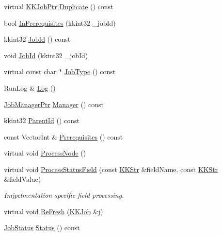 \begin{DoxyCompactItemize}
virtual \hyperlink{class_k_k_job_managment_1_1_k_k_job_a53526e4ffe4ab2b7858f79ab0ed65a1d}{K\+K\+Job\+Ptr} \hyperlink{class_k_k_job_managment_1_1_k_k_job_a8565b4f24dbcf979f959850e186cc91d}{Duplicate} () const 
\item 
bool \hyperlink{class_k_k_job_managment_1_1_k_k_job_a8da48b535df519acf19278af28bf5dee}{In\+Prerequisites} (kkint32 \+\_\+job\+Id)
\item 
kkint32 \hyperlink{class_k_k_job_managment_1_1_k_k_job_a37a4f0f8bfafda64563f30034348e5f5}{Job\+Id} () const 
\item 
void \hyperlink{class_k_k_job_managment_1_1_k_k_job_a0002b79993d2f4cb2e185c0cfcc22bf6}{Job\+Id} (kkint32 \+\_\+job\+Id)
\item 
virtual const char $\ast$ \hyperlink{class_k_k_job_managment_1_1_k_k_job_a77bf2a420c86aa73133a198416b97f81}{Job\+Type} () const 
\item 
Run\+Log \& \hyperlink{class_k_k_job_managment_1_1_k_k_job_a536ae6e96926995a86c5f3c65f26bd71}{Log} ()
\item 
\hyperlink{namespace_k_k_job_managment_aa12a7270f9983ca4ed916533dc8adbc4}{Job\+Manager\+Ptr} \hyperlink{class_k_k_job_managment_1_1_k_k_job_adbe88cadac87d49ce058fad86b2a2ab2}{Manager} () const 
\item 
kkint32 \hyperlink{class_k_k_job_managment_1_1_k_k_job_aa7501a072e3a0535099ab982a67867ae}{Parent\+Id} () const 
\item 
const Vector\+Int \& \hyperlink{class_k_k_job_managment_1_1_k_k_job_ae2ff42969518284ece1f2e4e78805489}{Prerequisites} () const 
\item 
virtual void \hyperlink{class_k_k_job_managment_1_1_k_k_job_a609d9e106ff0beb1d258e46b3a8de2db}{Process\+Node} ()
\item 
virtual void \hyperlink{class_k_k_job_managment_1_1_k_k_job_a0252f9a4246085bcbc54ec4093dca617}{Process\+Status\+Field} (const \hyperlink{class_k_k_b_1_1_k_k_str}{K\+K\+Str} \&field\+Name, const \hyperlink{class_k_k_b_1_1_k_k_str}{K\+K\+Str} \&field\+Value)
\begin{DoxyCompactList}\small\item\em Imjpelmentation specific field processing. \end{DoxyCompactList}\item 
virtual void \hyperlink{class_k_k_job_managment_1_1_k_k_job_a453bf2aa757cfd9630838f0ab13a3b73}{Re\+Fresh} (\hyperlink{class_k_k_job_managment_1_1_k_k_job}{K\+K\+Job} \&j)
\item 
\hyperlink{class_k_k_job_managment_1_1_k_k_job_afbd631ac794da7bbb00e0406ba89bac4}{Job\+Status} \hyperlink{class_k_k_job_managment_1_1_k_k_job_a13cdc9debaad9393c6f32894ae2474bf}{Status} () const 

\end{DoxyCompactItemize}

